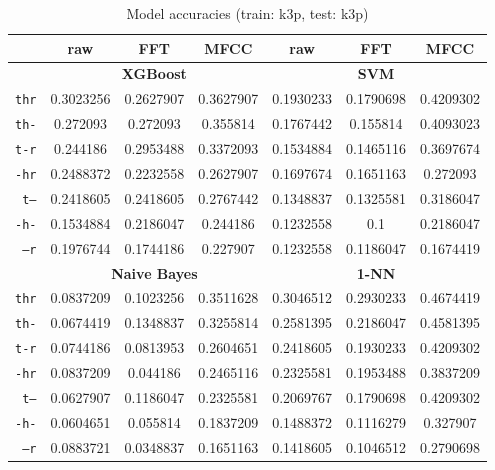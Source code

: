 \documentclass[../main.tex]{subfiles}
\begin{document}
\begin{table}[ht]
	\centering
	\vspace{-0.12cm}
	\caption{Model accuracies (train: k3p, test: k3p)}
	\vspace{-0.15cm}
	\label{tab:model_acc_k3p_k3p}
	\begin{small}
	\begin{tabular}{|r|c|c|c|c|c|c|}
		\hline
		 & \textbf{raw} & \textbf{FFT} & \textbf{MFCC} & \textbf{raw} & \textbf{FFT} & \textbf{MFCC} \\
		\hline
		 & \multicolumn{3}{|c|}{\textbf{XGBoost}} & \multicolumn{3}{|c|}{\textbf{SVM}} \\
		\hline
		\texttt{thr} & 0.3023256 & 0.2627907 & 0.3627907 & 0.1930233 & 0.1790698 & 0.4209302 \\
		\texttt{th-} & 0.272093 & 0.272093 & 0.355814 & 0.1767442 & 0.155814 & 0.4093023 \\
		\texttt{t-r} & 0.244186 & 0.2953488 & 0.3372093 & 0.1534884 & 0.1465116 & 0.3697674 \\
		\texttt{-hr} & 0.2488372 & 0.2232558 & 0.2627907 & 0.1697674 & 0.1651163 & 0.272093 \\
		\texttt{t--} & 0.2418605 & 0.2418605 & 0.2767442 & 0.1348837 & 0.1325581 & 0.3186047 \\
		\texttt{-h-} & 0.1534884 & 0.2186047 & 0.244186 & 0.1232558 & 0.1 & 0.2186047 \\
		\texttt{--r} & 0.1976744 & 0.1744186 & 0.227907 & 0.1232558 & 0.1186047 & 0.1674419 \\
		\hline
		 & \multicolumn{3}{|c|}{\textbf{Naive Bayes}} & \multicolumn{3}{|c|}{\textbf{1-NN}} \\
		\hline
		\texttt{thr} & 0.0837209 & 0.1023256 & 0.3511628 & 0.3046512 & 0.2930233 & 0.4674419 \\
		\texttt{th-} & 0.0674419 & 0.1348837 & 0.3255814 & 0.2581395 & 0.2186047 & 0.4581395 \\
		\texttt{t-r} & 0.0744186 & 0.0813953 & 0.2604651 & 0.2418605 & 0.1930233 & 0.4209302 \\
		\texttt{-hr} & 0.0837209 & 0.044186 & 0.2465116 & 0.2325581 & 0.1953488 & 0.3837209 \\
		\texttt{t--} & 0.0627907 & 0.1186047 & 0.2325581 & 0.2069767 & 0.1790698 & 0.4209302 \\
		\texttt{-h-} & 0.0604651 & 0.055814 & 0.1837209 & 0.1488372 & 0.1116279 & 0.327907 \\
		\texttt{--r} & 0.0883721 & 0.0348837 & 0.1651163 & 0.1418605 & 0.1046512 & 0.2790698 \\

\end{tabular}
\end{small}
\end{table}
\end{document}
